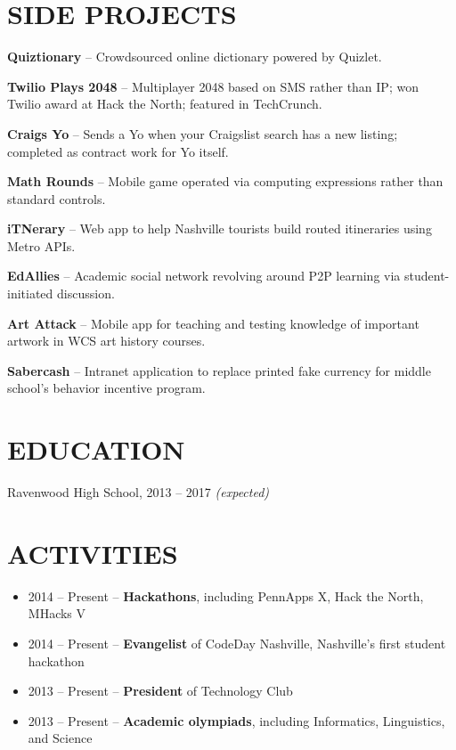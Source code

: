 \documentclass{res}
\begin{document}
\section{SIDE PROJECTS}

\textbf{Quiztionary} -- Crowdsourced online dictionary powered by Quizlet.

\textbf{Twilio Plays 2048} -- Multiplayer 2048 based on SMS rather than IP; won Twilio award at Hack the North; featured in TechCrunch.

\textbf{Craigs Yo} -- Sends a Yo when your Craigslist search has a new listing; completed as contract work for Yo itself.

\textbf{Math Rounds} -- Mobile game operated via computing expressions rather than standard controls.

\textbf{iTNerary} -- Web app to help Nashville tourists build routed itineraries using Metro APIs.

\textbf{EdAllies} -- Academic social network revolving around P2P learning via student-initiated discussion.

\textbf{Art Attack} -- Mobile app for teaching and testing knowledge of important artwork in WCS art history courses.

\textbf{Sabercash} -- Intranet application to replace printed fake currency for middle school's behavior incentive program.

\section{EDUCATION}

Ravenwood High School, 2013 -- 2017 \textit {(expected)}

\section{ACTIVITIES}

\begin{itemize} \itemsep -2pt
  \item 2014 -- Present -- \textbf{Hackathons}, including PennApps X, Hack the North, MHacks V
  \item 2014 -- Present -- \textbf{Evangelist} of CodeDay Nashville, Nashville's first student hackathon
  \item 2013 -- Present -- \textbf{President} of Technology Club
  \item 2013 -- Present -- \textbf{Academic olympiads}, including Informatics, Linguistics, and Science
\end{itemize}
\end{document}
